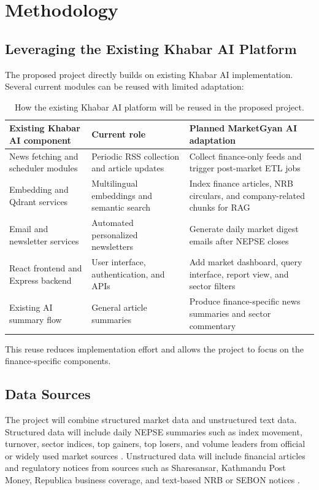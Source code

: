 \documentclass[12pt,a4paper]{report}
\begin{document}
\chapter{Methodology}

\section{Leveraging the Existing Khabar AI Platform}
The proposed project directly builds on existing Khabar AI implementation. Several current modules can be reused with limited adaptation:

\begin{table}[htbp]
\centering
\small
\begin{tabularx}{\textwidth}{|p{2.7cm}|Y|Y|}
\hline
\textbf{Existing Khabar AI component} & \textbf{Current role} & \textbf{Planned MarketGyan AI adaptation} \\
\hline
News fetching and scheduler modules & Periodic \ac{RSS} collection and article updates & Collect finance-only feeds and trigger post-market ETL jobs \\
\hline
Embedding and Qdrant services & Multilingual embeddings and semantic search & Index finance articles, \ac{NRB} circulars, and company-related chunks for \ac{RAG} \\
\hline
Email and newsletter services & Automated personalized newsletters & Generate daily market digest emails after \ac{NEPSE} closes \\
\hline
React frontend and Express backend & User interface, authentication, and APIs & Add market dashboard, query interface, report view, and sector filters \\
\hline
Existing AI summary flow & General article summaries & Produce finance-specific news summaries and sector commentary \\
\hline
\end{tabularx}
\caption{How the existing Khabar AI platform will be reused in the proposed project.}
\label{tab:khabar-reuse}
\end{table}

This reuse reduces implementation effort and allows the project to focus on the finance-specific components.

\section{Data Sources}
The project will combine structured market data and unstructured text data. Structured data will include daily \ac{NEPSE} summaries such as index movement, turnover, sector indices, top gainers, top losers, and volume leaders from official or widely used market sources \cite{nepse-official,sharesansar}. Unstructured data will include financial articles and regulatory notices from sources such as Sharesansar, Kathmandu Post Money, Republica business coverage, and text-based \ac{NRB} or \ac{SEBON} notices \cite{nrb-official,kathpost-money}.
\end{document}
